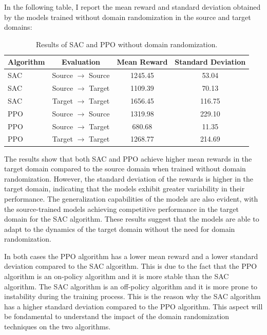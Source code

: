 \documentclass[12pt]{article}
\begin{document}
In the following table, I report the mean reward and standard deviation obtained by the models trained without domain randomization in the source and target domains:

\begin{table}[H]
    \centering
    \begin{tabular}{|l|c|c|c|}
        \hline
        \textbf{Algorithm} & \textbf{Evaluation} & \textbf{Mean Reward} & \textbf{Standard Deviation} \\ \hline
        SAC & Source $\rightarrow$ Source & 1245.45 & 53.04 \\ 
        SAC & Source $\rightarrow$ Target & 1109.39 & 70.13 \\ 
        SAC & Target $\rightarrow$ Target & 1656.45 & 116.75 \\ \hline
        PPO & Source $\rightarrow$ Source & 1319.98 & 229.10 \\ 
        PPO & Source $\rightarrow$ Target & 680.68 & 11.35 \\ 
        PPO & Target $\rightarrow$ Target & 1268.77 & 214.69 \\ \hline
    \end{tabular}
    \caption{Results of SAC and PPO without domain randomization.}
    \label{tab:results_no_randomization}
\end{table}

The results show that both SAC and PPO achieve higher mean rewards in the target domain compared to the source domain when trained without domain randomization. However, the standard deviation of the rewards is higher in the target domain, indicating that the models exhibit greater variability in their performance. The generalization capabilities of the models are also evident, with the source-trained models achieving competitive performance in the target domain for the SAC algorithm. These results suggest that the models are able to adapt to the dynamics of the target domain without the need for domain randomization.

In both cases the PPO algorithm has a lower mean reward and a lower standard deviation compared to the SAC algorithm. This is due to the fact that the PPO algorithm is an on-policy algorithm and it is more stable than the SAC algorithm. The SAC algorithm is an off-policy algorithm and it is more prone to instability during the training process. This is the reason why the SAC algorithm has a higher standard deviation compared to the PPO algorithm. This aspect will be fondamental to understand the impact of the domain randomization techniques on the two algorithms. 
\end{document}
